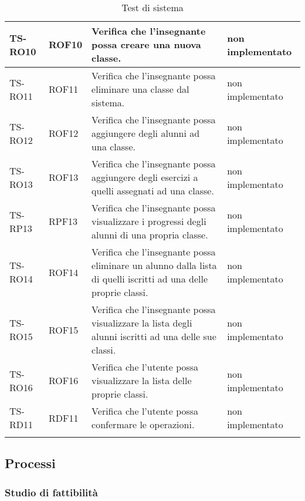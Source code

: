{\begin{longtable}{|>{\centering\arraybackslash}m{1.6cm}|>{\centering\arraybackslash}m{1.7cm}|m{6.41cm}|>{\centering\arraybackslash}m{3.1cm}|}
		\rowcolor{white}
		TS-RO10	
		& ROF10 
		& Verifica che l'insegnante possa creare una nuova classe. 
		& non implementato\\ \hline
		\rowcolor{LightGray}
		TS-RO11	
		& ROF11 
		& Verifica che l'insegnante possa eliminare una classe dal sistema. 
		& non implementato\\ \hline
		\rowcolor{white}
		TS-RO12
		& ROF12 
		& Verifica che l'insegnante possa aggiungere degli alunni ad una classe. 
		& non implementato\\ \hline
		\rowcolor{LightGray}
		TS-RO13
		& ROF13 
		& Verifica che l'insegnante possa aggiungere degli esercizi a quelli assegnati ad una classe. 
		& non implementato\\ \hline
		\rowcolor{white}
		TS-RP13
		& RPF13 
		& Verifica che l'insegnante possa visualizzare i progressi degli alunni di una propria classe.
		& non implementato\\ \hline
		\rowcolor{LightGray}
		TS-RO14
		& ROF14 
		& Verifica che l'insegnante possa eliminare un alunno dalla lista di quelli iscritti ad una delle proprie classi. 
		& non implementato\\ \hline
		\rowcolor{white}
		TS-RO15	
		& ROF15 
		& Verifica che l'insegnante possa visualizzare la lista degli alunni iscritti ad una delle sue classi. 
		& non implementato\\ \hline
		\rowcolor{LightGray}
		TS-RO16
		& ROF16 
		& Verifica che l'utente possa visualizzare la lista delle proprie classi. 
		& non implementato\\ \hline
		\rowcolor{white}
		TS-RD11	
		& RDF11 
		& Verifica che l'utente possa confermare le operazioni.
		& non implementato\\ \hline
		
		\caption{Test di sistema}
\end{longtable}}
\subsection{Processi}
\subsubsection{Studio di fattibilità}



